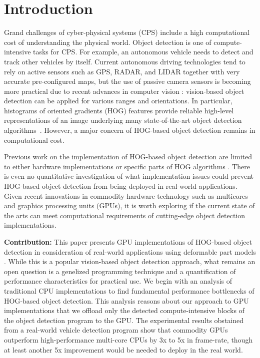 \section{Introduction}
\label{sec:introduction}

Grand challenges of cyber-physical systems (CPS) include a high
computational cost of understanding the physical world.
Object detection is one of compute-intensive tasks for CPS.
For example, an autonomous vehicle needs to detect and track other
vehicles by itself.
Current autonomous driving technologies \cite{Guizzo11, Levinson11,
Urmson08} tend to rely on active sensors such as GPS, RADAR, and LIDAR
\cite{Kirchner00, Streller02} together with very accurate pre-configured
maps, but the use of passive camera sensors is becoming more practical
due to recent advances in computer vision \cite{Dalal05, Felzenszwalb05,
Felzenszwalb10}: vision-based object detection can be applied for
various ranges and orientations.
In particular, histograms of oriented gradients (HOG) \cite{Dalal05}
features provide reliable high-level representations of an image
underlying many state-of-the-art object detection
algorithms~\cite{Felzenszwalb10, Geiger12, Rybski10, Suard06, Zhu06}.
However, a major concern of HOG-based object detection remains in
computational cost.

Previous work on the implementation of HOG-based object detection are
limited to either hardware implementations \cite{Kadota09, Karakaya09,
Komorkiewicz12} or specific parts of HOG algorithms \cite{Chen11,
Prisacariu09}.
There is even no quantitative investigation of what implementation
issues could prevent HOG-based object detection from being deployed in
real-world applications.
Given recent innovations in commodity hardware technology such as
multicores and graphics processing units (GPUs), it is worth
exploring if the current state of the arts can meet computational
requirements of cutting-edge object detection implementations.

\textbf{Contribution:}
This paper presents GPU implementations of HOG-based object detection in
consideration of real-world applications using deformable part models
\cite{Felzenszwalb10}.
While this is a popular vision-based object detection approach, what
remains an open question is a genelized programming technique and a
quantification of performance characteristics for practical use.
We begin with an analysis of traditional CPU
implementations to find fundamental performance bottlenecks of HOG-based
object detection.
This analysis reasons about our approach to GPU implementations that we
offload only the detected compute-intensive blocks of the object
detection program to the GPU.
The experimental results obstained from a real-world vehicle detection
program show that commodity GPUs outperform high-performance multi-core
CPUs by 3x to 5x in frame-rate, though at least another 5x improvement
would be needed to deploy in the real world.


